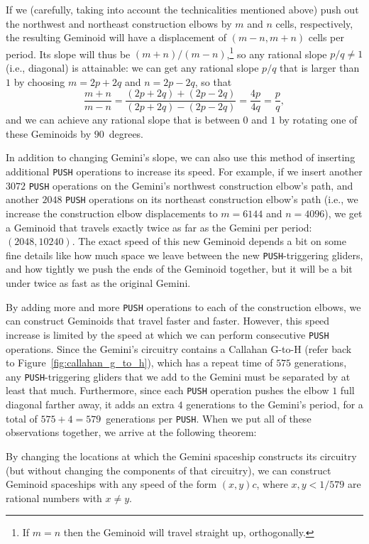 If we (carefully, taking into account the technicalities mentioned above) push out the northwest and northeast construction elbows by $m$ and $n$ cells, respectively, the resulting Geminoid will have a displacement of $(m-n,m+n)$ cells per period. Its slope will thus be $(m+n)/(m-n)$,\footnote{If $m = n$ then the Geminoid will travel straight up, orthogonally.} so any rational slope $p/q \neq 1$ (i.e., diagonal) is attainable: we can get any rational slope $p/q$ that is larger than $1$ by choosing $m = 2p+2q$ and $n = 2p-2q$, so that
\[
	\frac{m+n}{m-n} = \frac{(2p+2q)+(2p-2q)}{(2p+2q)-(2p-2q)} = \frac{4p}{4q} = \frac{p}{q},
\]
and we can achieve any rational slope that is between $0$ and $1$ by rotating one of these Geminoids by $90$~degrees.

In addition to changing Gemini's slope, we can also use this method of inserting additional \texttt{PUSH} operations to increase its speed. For example, if we insert another $3072$ \texttt{PUSH} operations on the Gemini's northwest construction elbow's path, and another $2048$ \texttt{PUSH} operations on its northeast construction elbow's path (i.e., we increase the construction elbow displacements to $m = 6144$ and $n = 4096$), we get a Geminoid that travels exactly twice as far as the Gemini per period: $(2048,10240)$. The exact speed of this new Geminoid depends a bit on some fine details like how much space we leave between the new \texttt{PUSH}-triggering gliders, and how tightly we push the ends of the Geminoid together, but it will be a bit under twice as fast as the original Gemini.

By adding more and more \texttt{PUSH} operations to each of the construction elbows, we can construct Geminoids that travel faster and faster. However, this speed increase is limited by the speed at which we can perform consecutive \texttt{PUSH} operations. Since the Gemini's circuitry contains a Callahan G-to-H (refer back to Figure~\ref{fig:callahan_g_to_h}), which has a repeat time of $575$ generations, any \texttt{PUSH}-triggering gliders that we add to the Gemini must be separated by at least that much. Furthermore, since each \texttt{PUSH} operation pushes the elbow $1$ full diagonal farther away, it adds an extra $4$ generations to the Gemini's period, for a total of $575+4 = 579$~generations per \texttt{PUSH}. When we put all of these observations together, we arrive at the following theorem:

\begin{theorem}\label{thm:geminoid_speed_limit}
	By changing the locations at which the Gemini spaceship constructs its circuitry (but without changing the components of that circuitry), we can construct Geminoid spaceships with any speed of the form $(x,y)c$, where $x, y < 1/579$ are rational numbers with $x \neq y$.
\end{theorem}

